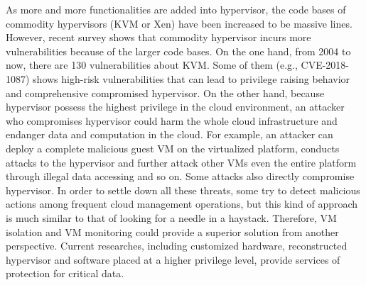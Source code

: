 \documentclass[conference]{IEEEtran}
\begin{document}
As more and more functionalities are added into hypervisor, the code bases of commodity hypervisors (KVM or Xen) have been increased to be massive lines. However, recent survey shows that commodity hypervisor incurs more vulnerabilities because of the larger code bases. 
On the one hand, from 2004 to now, there are 130 vulnerabilities about KVM.
Some of them (e.g., CVE-2018-1087)
shows high-risk vulnerabilities that can lead to privilege raising behavior and comprehensive compromised hypervisor.
On the other hand, because hypervisor possess the highest privilege in the cloud environment, an attacker who 
compromises hypervisor could harm the whole cloud infrastructure and endanger data and computation in the cloud. For example, an attacker can deploy a complete malicious guest VM on the virtualized platform, conducts attacks to the hypervisor and further attack other VMs even the entire platform through illegal data accessing and so on. Some attacks also directly compromise hypervisor.
In order to settle down all these threats, some try to detect malicious actions among frequent cloud management operations, but this kind of approach is much similar to that of looking for a needle in a haystack. Therefore, VM isolation and VM monitoring could provide a superior solution from another perspective. 
Current researches, including customized hardware, reconstructed hypervisor and software placed at a higher privilege level, provide services of protection for critical data.
\end{document}
